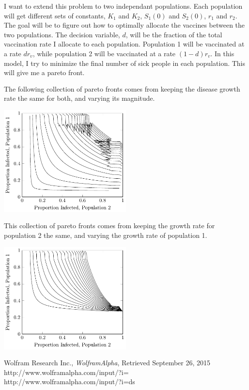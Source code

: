 \documentclass{article}
\begin{document}
I want to extend this problem to two independant populations. 
Each population will get different sets of constants,
	$K_1$ and $K_2$, $S_1(0)$ and $S_2(0)$, $r_1$ and $r_2$.
The goal will be to figure out how to optimally allocate the
	vaccines between the two populations.
The decision variable, $d$, will be the fraction of the total vaccination
	rate I allocate to each population.
Population 1 will be vaccinated at a rate $d r_v$, while population
	2 will be vaccinated at a rate $(1 - d) r_v$.
In this model, I try to minimize the final number of sick people in
	each population.
This will give me a pareto front.

The following collection of pareto fronts comes from keeping the disease
	growth rate the same for both, and varying its magnitude.

\includegraphics[width=0.5\textwidth]{figures/vaccination-model-same-r-pareto-curves.pdf}

This collection of pareto fronts comes from keeping the growth
	rate for population 2 the same, and varying the growth
	rate of population 1.

\includegraphics[width=0.5\textwidth]{figures/vaccination-model-different-r-pareto-curves.pdf}

\begin{thebibliography}{9}
	Wolfram Research Inc.,
	\emph{WolframAlpha},
	Retrieved September 26, 2015
	http://www.wolframalpha.com/input/?i=%
	http://www.wolframalpha.com/input/?i=ds%
\end{thebibliography}
\end{document}
